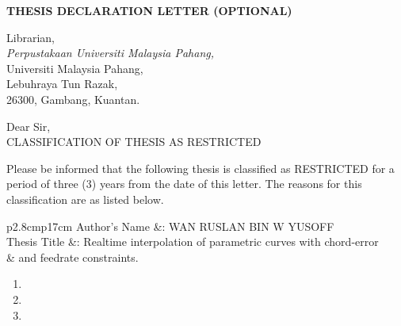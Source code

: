 \thispagestyle{empty}

\begin{center}
	\textbf{THESIS DECLARATION LETTER (OPTIONAL)}\\
	\vspace{0.5cm}
\end{center}

\begin{onehalfspacing}
\begin{flushleft}

Librarian,\\
\textit{Perpustakaan Universiti Malaysia Pahang,}\\
Universiti Malaysia Pahang,\\
Lebuhraya Tun Razak,\\
26300, Gambang, Kuantan.
\vspace{0.5cm}

Dear Sir,\\
\vspace{0.5cm}
CLASSIFICATION OF THESIS AS RESTRICTED\\
\end{flushleft}

\noindent
Please be informed that the following thesis is classified as RESTRICTED for a period of three (3) years from the date of this letter. The reasons for this classification are as listed below.

\begin{tabular}{p{2.8cm}p{17cm}}	
	Author's Name &: WAN RUSLAN BIN W YUSOFF\\
	Thesis Title  &: Realtime interpolation of parametric curves with chord-error \\
	 & and feedrate constraints.\\ 
\end{tabular}
\vspace{6pt}


\newenvironment{Reasons}
    {\text{Reasons:}\begin{minipage}[t]{0.8\linewidth}\begin{enumerate}[leftmargin=-.4in]}
    {\end{enumerate}\end{minipage}}

\begin{Reasons}
\vspace{6pt}
\item 
\item 
\item 
\end{Reasons}


\end{onehalfspacing}
